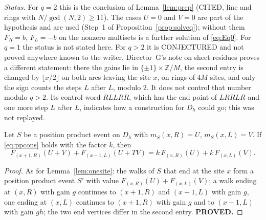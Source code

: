 \emph{Status.} For $q=2$ this is the conclusion of Lemma~\ref{lem:prep} (CITED, line and rings with $N/\gcd(N,2)\ge11$). The cases $U=0$ and $V=0$ are part of the hypothesis and are used (Step~1 of Proposition~\ref{prop:solveq}); without them $F_R=b$, $F_L=-b$ on the nonzero multisets is a further solution of \eqref{eq:Eq0}. For $q=1$ the status is not stated here. For $q>2$ it is CONJECTURED and not proved anywhere known to the writer. Director~G's note on sheet residues proves a different statement: there the gains lie in $\{\pm1\}\times\mathbb{Z}/M$, the second entry is changed by $\lfloor x/2\rfloor$ on both arcs leaving the site $x$, on rings of $4M$ sites, and only the sign counts the steps $L$ after $L$, modulo $2$. It does not control that number modulo $q>2$. Its control word $RLLRR$, which has the end point of $LRRLR$ and one more step $L$ after $L$, indicates how a construction for $D_h$ could go; this was not replayed.

\begin{lemma}\label{lem:onesiteq}
Let $S$ be a position product event on $D_h$ with $m_S(x,R)=U$, $m_S(x,L)=V$. If \eqref{eq:ppcons} holds with the factor $k$, then
\begin{equation}\label{eq:Eq}
F_{(x+1,R)}(U+V)+F_{(x-1,L)}(U+TV)=k\,F_{(x,R)}(U)+k\,F_{(x,L)}(V).
\end{equation}
\end{lemma}
\begin{proof}
As for Lemma~\ref{lem:onesite}: the walks of $S$ that end at the site $x$ form a position product event $S'$ with value $F_{(x,R)}(U)+F_{(x,L)}(V)$; a walk ending at $(x,R)$ with gain $g$ continues to $(x+1,R)$ and $(x-1,L)$ with gain $g$, one ending at $(x,L)$ continues to $(x+1,R)$ with gain $g$ and to $(x-1,L)$ with gain $gh$; the two end vertices differ in the second entry. \textbf{PROVED.}
\end{proof}

